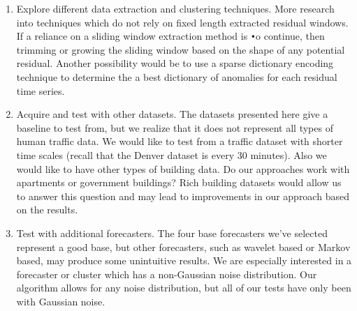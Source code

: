 \begin{enumerate}
	\item Explore different data extraction and clustering techniques.  More research into techniques which do not rely on fixed length extracted residual windows.  If a reliance on a sliding window extraction method is \texttt{•}o continue, then trimming or growing the sliding window based on the shape of any potential residual.  Another possibility would be to use a sparse dictionary encoding technique to determine the a best dictionary of anomalies for each residual time series.
	
	\item Acquire and test with other datasets.  The datasets presented here give a baseline to test from, but we realize that it does not represent all types of human traffic data.  We would like to test from a traffic dataset with shorter time scales (recall that the Denver dataset is every 30 minutes).  Also we would like to have other types of building data.  Do our approaches work with apartments or government buildings?  Rich building datasets would allow us to answer this question and may lead to improvements in our approach based on the results.
	
	\item Test with additional forecasters.  The four base forecasters we've selected represent a good base, but other forecasters, such as wavelet based or Markov based, may produce some unintuitive results.  We are especially interested in a forecaster or cluster which has a non-Gaussian noise distribution.  Our algorithm allows for any noise distribution, but all of our tests have only been with Gaussian noise.
\end{enumerate}

